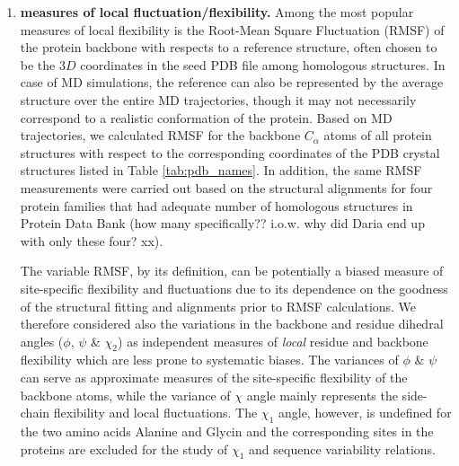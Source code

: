 \documentclass[12pt]{article}
\begin{document}
        \begin{enumerate}

            \item {\bf measures of local fluctuation/flexibility.}
                Among the most popular measures of local flexibility is the Root-Mean Square Fluctuation (RMSF) of the protein backbone with respects to a reference structure, often chosen to be the $3D$ coordinates in the seed PDB file among homologous structures. In case of MD simulations, the reference can also be represented by the average structure over the entire MD trajectories, though it may not necessarily correspond to a realistic conformation of the protein. Based on MD trajectories, we calculated RMSF for the backbone $C_\alpha$ atoms of all protein structures with respect to the corresponding coordinates of the PDB crystal structures listed in Table \ref{tab:pdb_names}. In addition, the same RMSF measurements were carried out based on the structural alignments for four protein families that had adequate number of homologous structures in Protein Data Bank (how many specifically?? i.o.w. why did Daria end up with only these four? xx).

                The variable RMSF, by its definition, can be potentially a biased measure of site-specific flexibility and fluctuations due to its dependence on the goodness of the structural fitting and alignments prior to RMSF calculations. We therefore considered also the variations in the backbone and residue dihedral angles ($\phi$, $\psi$ \& $\chi_2$) as independent measures of {\it local} residue and backbone flexibility which are less prone to systematic biases. The variances of $\phi$ \& $\psi$ can serve as approximate measures of the site-specific flexibility of the backbone atoms, while the variance of $\chi$ angle mainly represents the side-chain flexibility and local fluctuations. The $\chi_1$ angle, however, is undefined for the two amino acids Alanine and Glycin and the corresponding sites in the proteins are excluded for the study of $\chi_1$ and sequence variability relations.



\end{enumerate}
\end{document}
